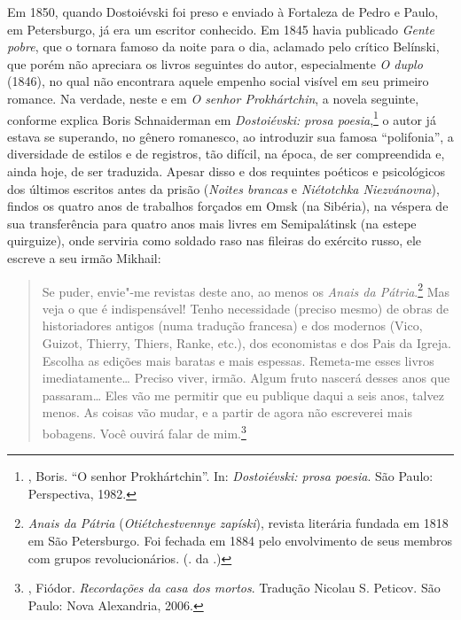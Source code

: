 Em 1850, quando Dostoiévski foi preso e enviado à Fortaleza de
Pedro e Paulo, em Petersburgo, já era um escritor conhecido. Em
1845 havia publicado \emph{Gente pobre}, que o tornara famoso
da noite para o dia, aclamado pelo crítico Belínski, que porém
não apreciara os livros seguintes do autor, especialmente \emph{O
duplo} (1846), no qual não encontrara aquele empenho social
visível em seu primeiro romance. Na verdade, neste e em
\emph{O senhor Prokhártchin}, a novela seguinte, conforme
explica Boris Schnaiderman em \emph{Dostoiévski:
prosa poesia},\footnote{, Boris. ``O senhor Prokhártchin''. In: \emph{Dostoiévski: prosa poesia}. São Paulo: Perspectiva, 1982.} o autor já estava se superando,
no gênero romanesco, ao introduzir sua famosa ``polifonia'', a
diversidade de estilos e de registros, tão difícil, na época,
de ser compreendida e, ainda hoje, de ser traduzida. Apesar
disso e dos requintes poéticos e psicológicos dos últimos
escritos antes da prisão (\emph{Noites brancas} e
\emph{Niétotchka Niezvánovna}), findos os quatro anos de
trabalhos forçados em Omsk (na Sibéria), na véspera de
sua transferência para quatro anos mais livres em
Semipalátinsk (na estepe quirguize), onde serviria como soldado
raso nas fileiras do exército russo, ele escreve a seu irmão
Mikhail: 

\begin{quotation}
Se puder, envie"-me revistas deste ano, ao menos os \emph{Anais da Pátria}.\footnote{\emph{Anais da Pátria} (\emph{Otiétchestvennye zapíski}), revista literária fundada em 1818 em São Petersburgo. Foi fechada em 1884 pelo envolvimento de seus membros com grupos revolucionários. (. da .)} Mas veja o que é indispensável! Tenho necessidade (preciso mesmo) de obras de historiadores antigos (numa tradução francesa) e dos modernos (Vico, Guizot, Thierry, Thiers, Ranke, etc.), dos economistas e dos Pais da Igreja. Escolha as edições mais baratas e mais espessas. Remeta-me esses livros imediatamente\ldots{} Preciso
viver, irmão. Algum fruto nascerá desses anos que passaram\ldots{} Eles vão me permitir que eu publique daqui a seis anos, talvez menos. As coisas vão mudar, e a partir de agora não escreverei mais bobagens. Você ouvirá falar de mim.\footnote{, Fiódor. \emph{Recordações da casa dos mortos}. Tradução Nicolau S. Peticov. São Paulo: Nova Alexandria, 2006.}
\end{quotation}

